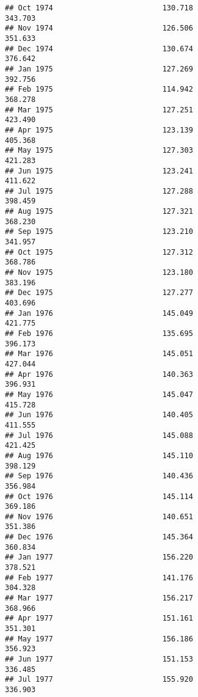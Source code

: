 \documentclass[
]{article}
\begin{document}
\begin{verbatim}
## Oct 1974                         130.718                           343.703
## Nov 1974                         126.506                           351.633
## Dec 1974                         130.674                           376.642
## Jan 1975                         127.269                           392.756
## Feb 1975                         114.942                           368.278
## Mar 1975                         127.251                           423.490
## Apr 1975                         123.139                           405.368
## May 1975                         127.303                           421.283
## Jun 1975                         123.241                           411.622
## Jul 1975                         127.288                           398.459
## Aug 1975                         127.321                           368.230
## Sep 1975                         123.210                           341.957
## Oct 1975                         127.312                           368.786
## Nov 1975                         123.180                           383.196
## Dec 1975                         127.277                           403.696
## Jan 1976                         145.049                           421.775
## Feb 1976                         135.695                           396.173
## Mar 1976                         145.051                           427.044
## Apr 1976                         140.363                           396.931
## May 1976                         145.047                           415.728
## Jun 1976                         140.405                           411.555
## Jul 1976                         145.088                           421.425
## Aug 1976                         145.110                           398.129
## Sep 1976                         140.436                           356.984
## Oct 1976                         145.114                           369.186
## Nov 1976                         140.651                           351.386
## Dec 1976                         145.364                           360.834
## Jan 1977                         156.220                           378.521
## Feb 1977                         141.176                           304.328
## Mar 1977                         156.217                           368.966
## Apr 1977                         151.161                           351.301
## May 1977                         156.186                           356.923
## Jun 1977                         151.153                           336.485
## Jul 1977                         155.920                           336.903

\end{verbatim}
\end{document}
